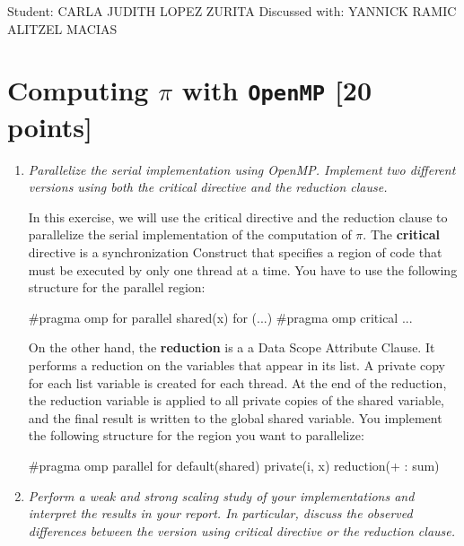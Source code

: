 \documentclass[unicode,11pt,a4paper,oneside,numbers=endperiod,openany]{scrartcl}
\begin{document}
\setassignment
{}

            {Student: CARLA JUDITH LOPEZ ZURITA}
            {Discussed with: YANNICK RAMIC \\
            \hspace*{370pt}ALITZEL MACIAS}
\newline

\section{Computing $\pi$ with \texttt{OpenMP} [20 points]}

\begin{enumerate}
    \item \textit{Parallelize the serial implementation using OpenMP. 
    Implement two different versions using both the critical directive and the
    reduction clause.}

    In this exercise, we will use the critical directive and the reduction
    clause to parallelize the serial implementation of the computation of $\pi$.
    The \textbf{critical} directive is a synchronization Construct that
    specifies a region of code that must be executed by only one thread at a
    time. \cite{hpc-tutorials-llnl-critical}
    You have to use the following structure for the parallel region:
    \begin{cppverbatim}
#pragma omp for parallel shared(x) 
for (...){
  #pragma omp critical 
  ...
}
    \end{cppverbatim}

    On the other hand, the \textbf{reduction} is a  a Data Scope Attribute
    Clause. It performs a reduction on the variables that appear in its list.
    A private copy for each list variable is created for each thread. At the end
    of the reduction, the reduction variable is applied to all private copies of
    the shared variable, and the final result is written to the global shared
    variable. \cite{hpc-tutorials-llnl-reduction}
    You implement the following structure for the region you want to parallelize:
    \begin{cppverbatim}
#pragma omp parallel for default(shared) private(i, x) reduction(+ : sum)
    \end{cppverbatim}

    \item \textit{Perform a weak and strong scaling study of your
    implementations and interpret the results in your report. 
    In particular, discuss the observed differences between the version using
    critical directive or the reduction clause.}


\end{enumerate}
\end{document}
